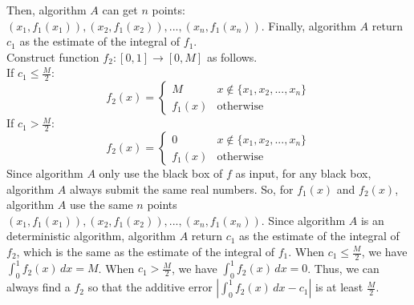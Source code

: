 Then, algorithm $A$ can get $n$ points: $(x_1,f_1(x_1)),(x_2,f_1(x_2)),...,(x_n,f_1(x_n))$.
Finally, algorithm $A$ return $c_1$ as the estimate of the integral of $f_1$.\\
Construct function $f_2:[0, 1]\rightarrow [0, M ]$ as follows. \\
If $c_1 \le \frac{M}{2}$:
\begin{equation}
   \nonumber  f_2(x)=
    \begin{cases}
    M& x\notin\{x_1,x_2,...,x_n\}\\
    f_1(x)& \text{otherwise}
    \end{cases}
\end{equation}
If $c_1 > \frac{M}{2}$:
\begin{equation}
   \nonumber  f_2(x)=
    \begin{cases}
    0& x\notin\{x_1,x_2,...,x_n\}\\
    f_1(x)& \text{otherwise}
    \end{cases}
\end{equation}
Since algorithm $A$ only use the black box of $f$ as input, 
for any black box, algorithm $A$ always submit the same real numbers.
So, for $f_1(x)$ and $f_2(x)$, algorithm $A$ use the same $n$ points $(x_1,f_1(x_1)),(x_2,f_1(x_2)),...,(x_n,f_1(x_n))$.
Since algorithm $A$ is an deterministic algorithm, 
algorithm $A$ return $c_1$ as the estimate of the integral of $f_2$, which is the same as the estimate of the integral of $f_1$.
When $c_1 \le \frac{M}{2}$, we have $\int_{0}^{1} f_2(x) \,dx=M$.
When $c_1 > \frac{M}{2}$, we have $\int_{0}^{1} f_2(x) \,dx=0$.
Thus, we can always find a $f_2$ so that the additive error $|\int_{0}^{1} f_2(x) \,dx - c_1|$ is at least $\frac{M}{2}$.
\\
\noindent {}\\
